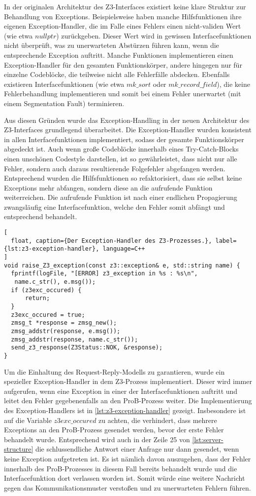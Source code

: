 In der originalen Architektur des Z3-Interfaces existiert keine klare Struktur zur Behandlung von Exceptions.
Beispielsweise haben manche Hilfsfunktionen ihre eigenen Exception-Handler, die im Falle eines Fehlers einen nicht-validen Wert (wie etwa $nullptr$) zurückgeben.
Dieser Wert wird in gewissen Interfacefunktionen nicht überprüft, was zu unerwarteten Abstürzen führen kann, wenn die entsprechende Exception auftritt.
Manche Funktionen implementieren einen Exception-Handler für den gesamten Funktionskörper, andere hingegen nur für einzelne Codeblöcke, die teilweise nicht alle Fehlerfälle abdecken.
Ebenfalls existieren Interfacefunktionen (wie etwa $mk\_sort$ oder $mk\_record\_field$), die keine Fehlerbehandlung implementieren und somit bei einem Fehler unerwartet (mit einem Segmentation Fault) terminieren.

Aus diesen Gründen wurde das Exception-Handling in der neuen Architektur des Z3-Interfaces grundlegend überarbeitet.
Die Exception-Handler wurden konsistent in allen Interfacefunktionen implementiert, sodass der gesamte Funktionskörper abgedeckt ist.
Auch wenn große Codeblöcke innerhalb eines Try-Catch-Blocks einen unschönen Codestyle darstellen,
ist so gewährleistet, dass nicht nur alle Fehler, sondern auch daraus resultierende Folgefehler abgefangen werden.
Entsprechend wurden die Hilfsfunktionen so refaktorisiert, dass sie selbst keine Exceptions mehr abfangen, sondern diese an die aufrufende Funktion weiterreichen.
Die aufrufende Funktion ist nach einer endlichen Propagierung zwangsläufig eine Interfacefunktion, welche den Fehler somit abfängt und entsprechend behandelt.

\begin{lstlisting}[
  float, caption={Der Exception-Handler des Z3-Prozesses.}, label={lst:z3-exception-handler}, language=C++
]
void raise_Z3_exception(const z3::exception& e, std::string name) {
  fprintf(logFile, "[ERROR] z3_exception in %s : %s\n",
   name.c_str(), e.msg());
  if (z3exc_occured) {
      return;
  }
  z3exc_occured = true;
  zmsg_t *response = zmsg_new();
  zmsg_addstr(response, e.msg());
  zmsg_addstr(response, name.c_str());
  send_z3_response(Z3Status::NOK, &response);
}
\end{lstlisting}

Um die Einhaltung des Request-Reply-Modells zu garantieren, wurde ein spezieller Exception-Handler in dem Z3-Prozess implementiert.
Dieser wird immer aufgerufen, wenn eine Exception in einer der Interfacefunktionen auftritt und leitet den Fehler gegebenenfalls an den ProB-Prozess weiter.
Die Implementierung des Exception-Handlers ist in \cref{lst:z3-exception-handler} gezeigt.
Insbesondere ist auf die Variable $z3exc\_occured$ zu achten, die verhindert, dass mehrere Exceptions an den ProB-Prozess gesendet werden, bevor der erste Fehler behandelt wurde.
Entsprechend wird auch in der Zeile 25 von \cref{lst:server-structure} die schlussendliche Antwort einer Anfrage nur dann gesendet, wenn keine Exception aufgetreten ist.
Es ist nämlich davon auszugehen, dass der Fehler innerhalb des ProB-Prozesses in diesem Fall bereits behandelt wurde und die Interfacefunktion dort verlassen worden ist.
Somit würde eine weitere Nachricht gegen das Kommunikationsmuster verstoßen und zu unerwarteten Fehlern führen.

